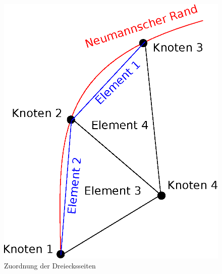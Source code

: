 \begin{figure}[htbp]
	\begin{minipage}[t]{0.45\textwidth}
	\includegraphics[scale=0.65]{pics/neumann_boundary_assignment.eps}
	\caption{Zuordnung der Dreiecksseiten}
	\label{fig:neumann_boundary_assignment}
	\end{minipage}
	\hfill
	\begin{minipage}[t]{0.45\textwidth}

\end{minipage}
\end{figure}
